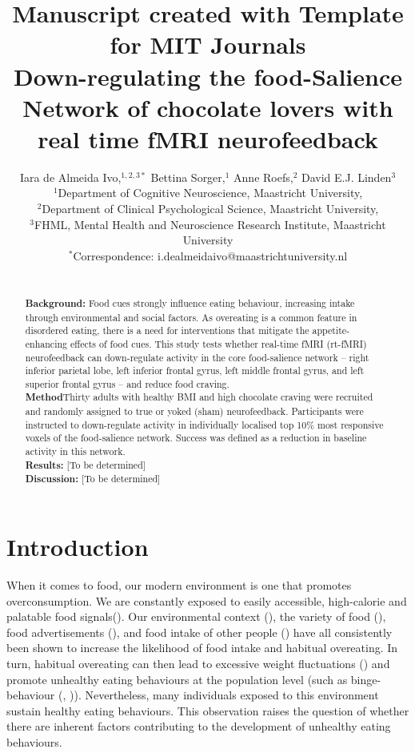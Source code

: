 \documentclass[]{imag-ms-template}
\title{
{\small Manuscript created with Template for MIT Journals} \\
{Down-regulating the food-Salience Network of chocolate lovers with real time fMRI neurofeedback}
}
\author {Iara de Almeida Ivo,$^{1,2,3\ast}$  Bettina Sorger,$^{1}$ Anne Roefs,$^{2}$ David E.J. Linden$^{3}$\\
{\small $^{1}$Department of Cognitive Neuroscience, Maastricht University,}\\
{\small $^{2}$Department of Clinical Psychological Science, Maastricht University,}\\
{\small $^{3}$FHML, Mental Health and Neuroscience Research Institute, Maastricht University}\\
{\small $^\ast$Correspondence:  i.dealmeidaivo@maastrichtuniversity.nl}
}
\begin{document}
 

\maketitle 


\newpage

\begin{abstract}
  \\ \textbf{Background:} Food cues strongly influence eating behaviour, increasing intake through environmental and social factors. As overeating is a common feature in disordered eating, there is a need for interventions that mitigate the appetite-enhancing effects of food cues. This study tests whether real-time fMRI (rt-fMRI) neurofeedback can down-regulate activity in the core food-salience network – right inferior parietal lobe, left inferior frontal gyrus, left middle frontal gyrus, and left superior frontal gyrus – and reduce food craving. \\ \textbf{Method}Thirty adults with healthy BMI and high chocolate craving were recruited and randomly assigned to true or yoked (sham) neurofeedback. Participants were instructed to down-regulate activity in individually localised top 10\% most responsive voxels of the food-salience network. Success was defined as a reduction in baseline activity in this network.
  \\\textbf{Results:} [To be determined] \\\textbf{Discussion:} [To be determined]
\end{abstract}

\newpage

\section{Introduction}

When it comes to food, our modern environment is one that promotes overconsumption. We are constantly exposed to easily accessible, high-calorie and palatable food signals(\cite{hillObesityOverviewEpidemic2005}). Our environmental context (\cite{jansenCuedOvereating2011b}), the variety of food (\cite{guerrieriInteractionImpulsivityVaried2008, remickInternalExternalModerators2009}), food advertisements (\cite{harrisPrimingEffectsTelevision2009}), and food intake of other people (\cite{hermansMimicryFoodIntake2012}) have all consistently been shown to increase the likelihood of food intake and habitual overeating. In turn, habitual overeating can then lead to excessive weight fluctuations (\cite{jansenCuedOvereating2011b, frankortCravingStopsYou2014}) and promote unhealthy eating behaviours at the population level (such as binge-behaviour  (\cite{jainBulimiaNervosa2025}, \cite{berkmanManagementOutcomesBingeEating2015})). Nevertheless, many individuals exposed to this environment sustain healthy eating behaviours. This observation raises the question of whether there are inherent factors contributing to the development of unhealthy eating behaviours.
\end{document}
